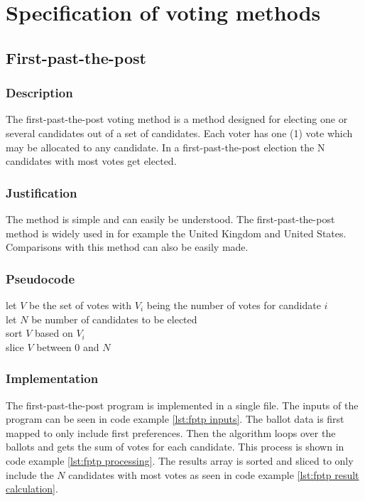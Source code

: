 \documentclass[12pt]{article}
\begin{document}
\pagebreak
\section{Specification of voting methods}
\subsection{First-past-the-post}
\subsubsection{Description}
The first-past-the-post voting method is a method designed for electing one or several candidates out of a set of candidates. Each voter has one (1) vote which may be allocated to any candidate. In a first-past-the-post election the N candidates with most votes get elected.
\subsubsection{Justification}
The method is simple and can easily be understood. The first-past-the-post method is widely used in for example the United Kingdom and United States. Comparisons with this method can also be easily made.
\subsubsection{Pseudocode}
let $V$ be the set of votes with $V_{i}$ being the number of votes for candidate $i$ \\
let $N$ be number of candidates to be elected \\
sort $V$ based on $V_{i}$\\
slice $V$ between $0$ and $N$
\subsubsection{Implementation}
The first-past-the-post program is implemented in a single file. The inputs of the program can be seen in code example \ref{lst:fptp inputs}.
The ballot data is first mapped to only include first preferences. Then the algorithm loops over the ballots and gets the sum of votes for each candidate. This process is shown in code example \ref{lst:fptp processing}.
The results array is sorted and sliced to only include the $N$ candidates with most votes as seen in code example \ref{lst:fptp result calculation}.
\end{document}
